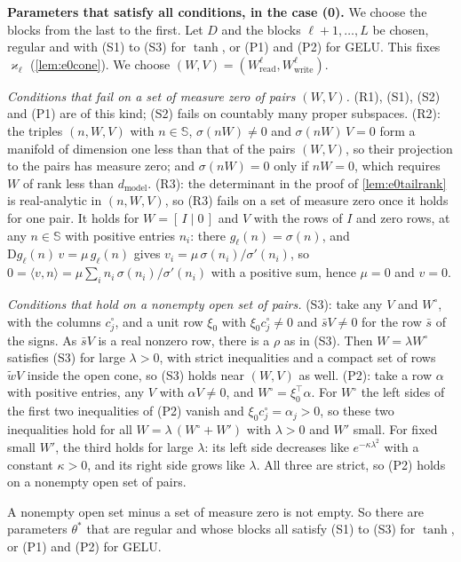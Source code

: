 \documentclass[10pt]{article}
\theoremstyle{definition}
\theoremstyle{remark}
\newcommand{\Wread}{W_{\mathrm{read}}}
\newcommand{\Wwrite}{W_{\mathrm{write}}}
\newcommand{\dm}{d_{\mathrm{model}}}
\newcommand{\Der}{\mathrm{D}}
\newcommand{\para}[1]{\smallskip\noindent\textbf{#1}\hspace{0.5em}}
\begin{document}
\para{Parameters that satisfy all conditions, in the case (0).} We choose the blocks from the last to the first. Let $D$ and the blocks $\ell+1, \dots, L$ be chosen, regular and with (S1) to (S3) for $\tanh$, or (P1) and (P2) for GELU. This fixes $\varkappa_\ell$ (\cref{lem:e0cone}). We choose $(W, V) = (\Wread^{\ell}, \Wwrite^{\ell})$.

\emph{Conditions that fail on a set of measure zero of pairs $(W, V)$.} (R1), (S1), (S2) and (P1) are of this kind; (S2) fails on countably many proper subspaces. (R2): the triples $(n, W, V)$ with $n \in \mathbb S$, $\sigma(nW) \neq 0$ and $\sigma(nW)\,V = 0$ form a manifold of dimension one less than that of the pairs $(W, V)$, so their projection to the pairs has measure zero; and $\sigma(nW) = 0$ only if $nW = 0$, which requires $W$ of rank less than $\dm$. (R3): the determinant in the proof of \cref{lem:e0tailrank} is real-analytic in $(n, W, V)$, so (R3) fails on a set of measure zero once it holds for one pair. It holds for $W = [\,I \mid 0\,]$ and $V$ with the rows of $I$ and zero rows, at any $n \in \mathbb S$ with positive entries $n_i$: there $g_\ell(n) = \sigma(n)$, and $\Der g_\ell(n)\,v = \mu\,g_\ell(n)$ gives $v_i = \mu\,\sigma(n_i)/\sigma'(n_i)$, so $0 = \langle v, n\rangle = \mu\sum_i n_i\,\sigma(n_i)/\sigma'(n_i)$ with a positive sum, hence $\mu = 0$ and $v = 0$.

\emph{Conditions that hold on a nonempty open set of pairs.} (S3): take any $V$ and $W^\circ$, with the columns $c^\circ_j$, and a unit row $\xi_0$ with $\xi_0c^\circ_j \neq 0$ and $\bar sV \neq 0$ for the row $\bar s$ of the signs. As $\bar sV$ is a real nonzero row, there is a $\rho$ as in (S3). Then $W = \lambda W^\circ$ satisfies (S3) for large $\lambda > 0$, with strict inequalities and a compact set of rows $\tilde wV$ inside the open cone, so (S3) holds near $(W, V)$ as well. (P2): take a row $\alpha$ with positive entries, any $V$ with $\alpha V \neq 0$, and $W^\circ = \xi_0^\top\alpha$. For $W^\circ$ the left sides of the first two inequalities of (P2) vanish and $\xi_0c^\circ_j = \alpha_j > 0$, so these two inequalities hold for all $W = \lambda\,(W^\circ + W')$ with $\lambda > 0$ and $W'$ small. For fixed small $W'$, the third holds for large $\lambda$: its left side decreases like $e^{-\kappa\lambda^2}$ with a constant $\kappa > 0$, and its right side grows like $\lambda$. All three are strict, so (P2) holds on a nonempty open set of pairs.

A nonempty open set minus a set of measure zero is not empty. So there are parameters $\theta^*$ that are regular and whose blocks all satisfy (S1) to (S3) for $\tanh$, or (P1) and (P2) for GELU.
\end{document}
